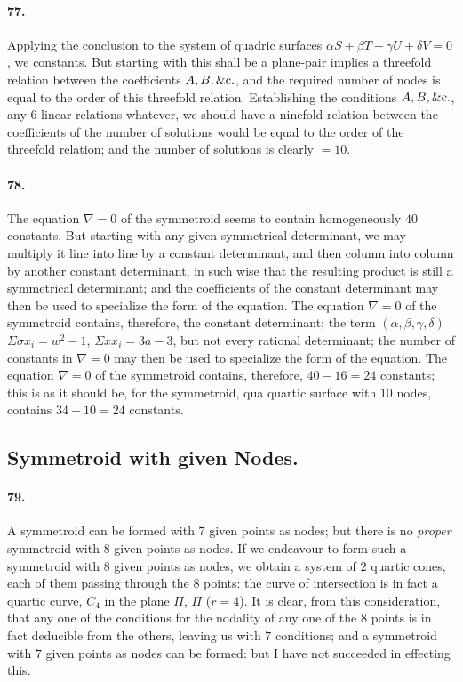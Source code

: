 \documentclass[11pt,a4paper]{article}
\begin{document}
\bigskip

\paragraph{77.}
Applying the conclusion to the system of quadric surfaces
$\alpha S + \beta T + \gamma U + \delta V = 0$, we constants. But starting with this
shall be a plane-pair implies a threefold relation between the coefficients
$A, B, \&{\rm c}.$, and the required number of nodes is equal to the order of this
threefold relation. Establishing the conditions $A, B, \&{\rm c}.$, any $6$ linear
relations whatever, we should have a ninefold relation between the coefficients of
the number of solutions would be equal to the order of the threefold relation; and
the number of solutions is clearly $= 10$.

\medskip

\paragraph{78.}
The equation $\nabla = 0$ of the symmetroid seems to contain homogeneously $40$
constants. But starting with any given symmetrical determinant, we may multiply it
line into line by a constant determinant, and then column into column by another
constant determinant, in such wise that the resulting product is still a symmetrical
determinant; and the coefficients of the constant determinant may then be used to
specialize the form of the equation. The equation $\nabla = 0$ of the symmetroid
contains, therefore, the constant determinant; the term $(\alpha, \beta, \gamma, \delta)$
$\Sigma\sigma x_i = w^2 - 1$, $\Sigma x x_i = 3a - 3$, but not every rational
determinant; the number of constants in $\nabla = 0$ may then be used to specialize the
form of the equation. The equation $\nabla = 0$ of the symmetroid contains, therefore,
$40 - 16 = 24$ constants; this is as it should be, for the symmetroid, qua quartic
surface with $10$ nodes, contains $34 - 10 = 24$ constants.

\bigskip

\subsection*{Symmetroid with given Nodes.}

\paragraph{79.}
A symmetroid can be formed with $7$ given points as nodes; but there is no
\textit{proper} symmetroid with $8$ given points as nodes. If we endeavour to form
such a symmetroid with $8$ given points as nodes, we obtain a system of $2$ quartic
cones, each of them passing through the $8$ points: the curve of intersection is in
fact a quartic curve, $C_{4}$ in the plane $\Pi$, $\Pi$ ($r = 4$). It is clear, from
this consideration, that any one of the conditions for the nodality of any one of
the $8$ points is in fact deducible from the others, leaving us with $7$ conditions;
and a symmetroid with $7$ given points as nodes can be formed: but I have not
succeeded in effecting this.
\end{document}
